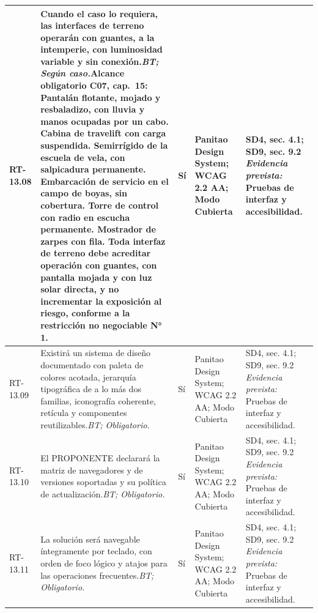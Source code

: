 \begin{paginaHorizontalSynaptix}
\begin{longtable}{|L{0.09\AnchoMatrizTDoce}|L{0.385\AnchoMatrizTDoce}|L{0.065\AnchoMatrizTDoce}|L{0.18\AnchoMatrizTDoce}|L{0.28\AnchoMatrizTDoce}|}
RT-\allowbreak{}13.\allowbreak{}08 &
Cuando el caso lo requiera, las interfaces de terreno operarán con guantes, a la intemperie, con luminosidad variable y sin conexión.\newline\textit{BT; Según caso.}\newline\textbf{Alcance obligatorio C07, cap.~15:} Pantalán flotante, mojado y resbaladizo, con lluvia y manos ocupadas por un cabo. Cabina de travelift con carga suspendida. Semirrígido de la escuela de vela, con salpicadura permanente. Embarcación de servicio en el campo de boyas, sin cobertura. Torre de control con radio en escucha permanente. Mostrador de zarpes con fila. Toda interfaz de terreno debe acreditar operación con guantes, con pantalla mojada y con luz solar directa, y no incrementar la exposición al riesgo, conforme a la restricción no negociable N° 1. &
Sí &
Panitao Design System; WCAG 2.2 AA; Modo Cubierta &
SD4, sec. 4.1; SD9, sec. 9.2 \newline\textit{Evidencia prevista:} Pruebas de interfaz y accesibilidad. \\ \hline

RT-\allowbreak{}13.\allowbreak{}09 &
Existirá un sistema de diseño documentado con paleta de colores acotada, jerarquía tipográfica de a lo más dos familias, iconografía coherente, retícula y componentes reutilizables.\newline\textit{BT; Obligatorio.} &
Sí &
Panitao Design System; WCAG 2.2 AA; Modo Cubierta &
SD4, sec. 4.1; SD9, sec. 9.2 \newline\textit{Evidencia prevista:} Pruebas de interfaz y accesibilidad. \\ \hline

RT-\allowbreak{}13.\allowbreak{}10 &
El PROPONENTE declarará la matriz de navegadores y de versiones soportadas y su política de actualización.\newline\textit{BT; Obligatorio.} &
Sí &
Panitao Design System; WCAG 2.2 AA; Modo Cubierta &
SD4, sec. 4.1; SD9, sec. 9.2 \newline\textit{Evidencia prevista:} Pruebas de interfaz y accesibilidad. \\ \hline

RT-\allowbreak{}13.\allowbreak{}11 &
La solución será navegable íntegramente por teclado, con orden de foco lógico y atajos para las operaciones frecuentes.\newline\textit{BT; Obligatorio.} &
Sí &
Panitao Design System; WCAG 2.2 AA; Modo Cubierta &
SD4, sec. 4.1; SD9, sec. 9.2 \newline\textit{Evidencia prevista:} Pruebas de interfaz y accesibilidad. \\ \hline


\end{longtable}
\end{paginaHorizontalSynaptix}
